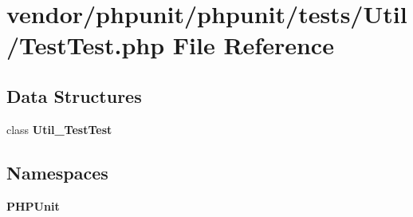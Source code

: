 \section{vendor/phpunit/phpunit/tests/\+Util/\+Test\+Test.php File Reference}
\label{_test_test_8php}
\subsection*{Data Structures}
\begin{DoxyCompactItemize}
\item 
class {\bf Util\+\_\+\+Test\+Test}
\end{DoxyCompactItemize}
\subsection*{Namespaces}
\begin{DoxyCompactItemize}
\item 
 {\bf P\+H\+P\+Unit}
\end{DoxyCompactItemize}
